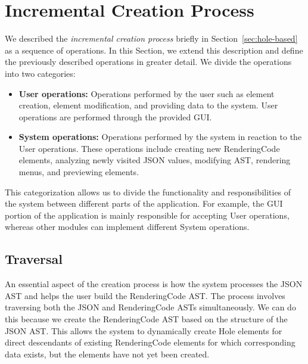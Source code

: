 \section{Incremental Creation Process}
\label{sec:creation}
We described the \emph{incremental creation process} briefly in Section~\ref{sec:hole-based} as a sequence of operations.
In this Section, we extend this description and define the previously described operations in greater detail.
We divide the operations into two categories:
\begin{itemize}
	\item \textbf{User operations:} Operations performed by the user such as element creation, element modification, and providing data to the system.
	      User operations are performed through the provided GUI.
	\item \textbf{System operations:} Operations performed by the system in reaction to the User operations.
	      These operations include creating new RenderingCode elements, analyzing newly visited JSON values, modifying AST, rendering menus, and previewing elements.
\end{itemize}
This categorization allows us to divide the functionality and responsibilities of the system between different parts of the application.
For example, the GUI portion of the application is mainly responsible for accepting User operations, whereas other modules can implement different System operations.


\subsection{Traversal}
\label{sec:traversal}
An essential aspect of the creation process is how the system processes the JSON AST and helps the user build the RenderingCode AST.
The process involves traversing both the JSON and RenderingCode ASTs simultaneously.
We can do this because we create the RenderingCode AST based on the structure of the JSON AST.
This allows the system to dynamically create Hole elements for direct descendants of existing RenderingCode elements for which corresponding data exists, but the elements have not yet been created.

